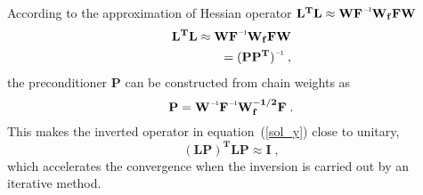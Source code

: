 According to the approximation of Hessian operator $\mathbf{L^{T}L \approx W\inv{F}W_{f}FW}$
\begin{equation} \label{precondition}
\begin{split}
    \mathbf{L^{T}L \approx W\inv{F}W_{f}FW} \\
            \mathbf{=  \inv{(PP^{T})}}\;,
\end{split}
\end{equation}
the preconditioner $\mathbf{P}$ can be constructed from chain weights as
\begin{equation}
    \mathbf{P = \inv{W}\inv{F}W_{f}^{-1/2}F}\;.
\label{prec}
\end{equation}
This makes the inverted operator in equation~(\ref{sol_y}) close to unitary,
\begin{equation}
    \mathbf{(LP)^{T}LP \approx I}\;,
\end{equation}
which accelerates the convergence when the inversion is carried out by an iterative method.  
